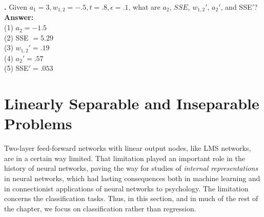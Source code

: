 \noindent
{}
{\bf \theLMSCounter.}  Given $a_1 = 3 ,w_{1,2} = -.5, t = .8 ,\epsilon = .1$, what are $a_2$, $SSE$, $w_{1,2}'$, $a_2'$, and SSE$'$? \\
{\bf Answer:} \\
(1) $a_2 = -1.5$ \\
(2) SSE $= 5.29$ \\
(3) $w_{1,2}' = .19$ \\
(4) $a_2' = .57$ \\
(5) SSE$' = .053$
\bigskip


\section{Linearly Separable and Inseparable Problems}
\label{linearlySeparable}


Two-layer feed-forward networks with linear output nodes, like LMS networks, are in a certain way limited. That limitation played  an important role in the history of neural networks, paving the way for studies of \emph{internal representations} in neural networks, which had lasting consequences both in machine learning and in connectionist applications of neural networks to psychology.  The limitation concerns the  classification tasks. Thus, in this section, and in much of the rest of the chapter, we focus on classification rather than regression.

